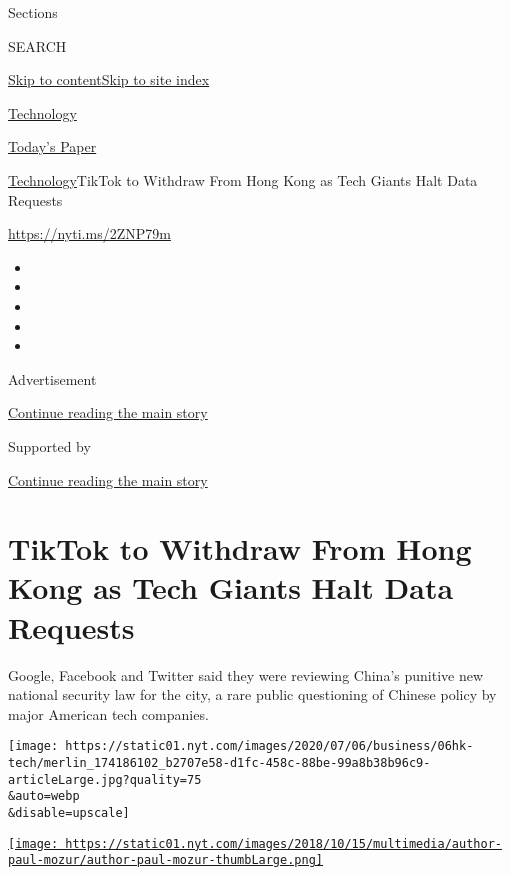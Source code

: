 Sections

SEARCH

\protect\hyperlink{site-content}{Skip to
content}\protect\hyperlink{site-index}{Skip to site index}

\href{https://www.nytimes.com/section/technology}{Technology}

\href{https://myaccount.nytimes.com/auth/login?response_type=cookie\&client_id=vi}{}

\href{https://www.nytimes.com/section/todayspaper}{Today's Paper}

\href{/section/technology}{Technology}\textbar{}TikTok to Withdraw From
Hong Kong as Tech Giants Halt Data Requests

\url{https://nyti.ms/2ZNP79m}

\begin{itemize}
\item
\item
\item
\item
\item
\end{itemize}

Advertisement

\protect\hyperlink{after-top}{Continue reading the main story}

Supported by

\protect\hyperlink{after-sponsor}{Continue reading the main story}

\hypertarget{tiktok-to-withdraw-from-hong-kong-as-tech-giants-halt-data-requests}{%
\section{TikTok to Withdraw From Hong Kong as Tech Giants Halt Data
Requests}\label{tiktok-to-withdraw-from-hong-kong-as-tech-giants-halt-data-requests}}

Google, Facebook and Twitter said they were reviewing China's punitive
new national security law for the city, a rare public questioning of
Chinese policy by major American tech companies.

\texttt{[image: https://static01.nyt.com/images/2020/07/06/business/06hk-tech/merlin\_174186102\_b2707e58-d1fc-458c-88be-99a8b38b96c9-articleLarge.jpg?quality=75\\\&auto=webp\\\&disable=upscale]}

\href{https://www.nytimes.com/by/paul-mozur}{\texttt{[image: https://static01.nyt.com/images/2018/10/15/multimedia/author-paul-mozur/author-paul-mozur-thumbLarge.png]}}

